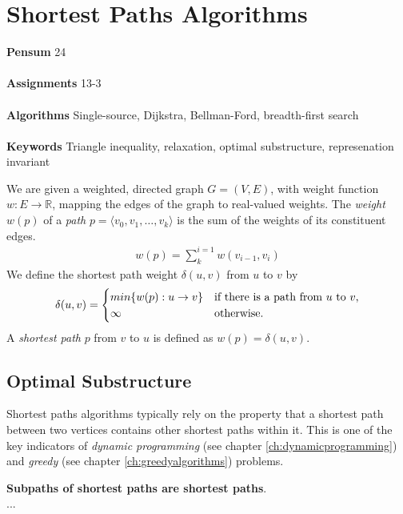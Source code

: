 
\chapter{Shortest Paths Algorithms}
\label{ch:shortestpathsalgorithms}

\textbf{Pensum} 24 \cite{clrs} \\\\
\textbf{Assignments} 13-3 \\\\
\textbf{Algorithms} Single-source, Dijkstra, Bellman-Ford, breadth-first
search \\\\
\textbf{Keywords} Triangle inequality, relaxation, optimal substructure,
represenation invariant
\vspace{1in}

\noindent We are given a weighted, directed graph $G = (V, E)$, with weight
function $w : E \rightarrow \mathbb{R}$, mapping the edges of the graph to
real-valued weights. The \textit{weight} $w(p)$ of a \textit{path} $p =
\langle v_0, v_1, \dots, v_k \rangle$ is the sum of the weights of its
constituent edges.
\begin{align}
	w(p) = \sum_{k}^{i=1} w(v_{i-1}, v_i)
\end{align}
We define the shortest path weight $\delta(u, v)$ from $u$ to $v$ by
\begin{align}
	\delta(u, v) =
	\begin{cases}
		min\{w(p): u \rightarrow v\}
		& \textnormal{if there is a path from $u$ to $v$,} \\
		\infty & \textnormal{otherwise.}
	\end{cases}
\end{align}
A \textit{shortest path} $p$ from $v$ to $u$ is defined as $w(p) =
\delta(u, v)$.

\newpage
\section{Optimal Substructure}
Shortest paths algorithms typically rely on the property that a shortest path
between two vertices contains other shortest paths within it. This is one of
the key indicators of \textit{dynamic programming} (see chapter
\ref{ch:dynamicprogramming}) and \textit{greedy} (see chapter
\ref{ch:greedyalgorithms}) problems.

\begin{lemma}
	\textbf{Subpaths of shortest paths are shortest paths}. \\
	...
\end{lemma} 


